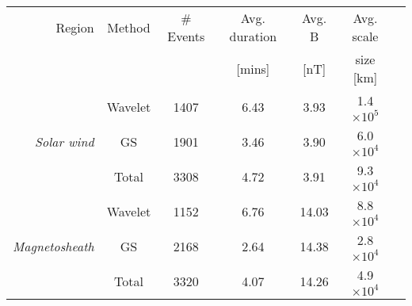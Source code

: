 \begin{tabular}{rcccccc}
\hline
Region                    &  Method &  \# Events &  Avg. duration &  Avg. B &  Avg. scale \\
                          &         &            &  [mins]        &  [nT]   &  size [km] \\
\hline
         	         & Wavelet & 1407 & 6.43 & 3.93  & 1.4$\times 10^5$ \\
\textit{Solar wind} 	  & GS 	    & 1901 & 3.46 & 3.90  & 6.0$\times 10^4$ \\
         	           & Total   & 3308 & 4.72 & 3.91  & 9.3$\times 10^4$ \\
\hline
         	         & Wavelet & 1152 & 6.76 & 14.03 & 8.8$\times 10^4$ \\
\textit{Magnetosheath}    & GS 		& 2168 & 2.64 & 14.38 & 2.8$\times 10^4$ \\
         	         & Total   & 3320 & 4.07 & 14.26 & 4.9$\times 10^4$ \\
\hline
\end{tabular}
